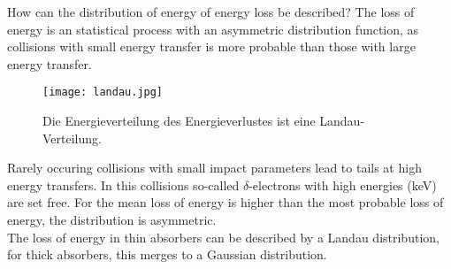 How can the distribution of energy of energy loss be described? The loss of energy is an statistical
process with an asymmetric distribution function, as collisions with small energy transfer is more
probable than those with large energy transfer.

\begin{figure}[H]
	\centering
	\texttt{[image: landau.jpg]}
	\caption{Die Energieverteilung des Energieverlustes ist eine Landau-Verteilung.}
	\label{}
\end{figure}

Rarely occuring collisions with small impact parameters lead to tails at high energy transfers. In
this collisions so-called $\delta$-electrons with high energies (keV) are set free. For the mean
loss of energy is higher than the most probable loss of energy, the distribution is asymmetric.
\\
The loss of energy in thin absorbers can be described by a Landau distribution, for thick absorbers,
this merges to a Gaussian distribution.
